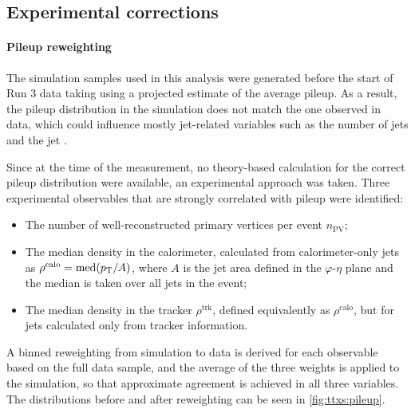 \subsection{Experimental corrections}
\label{sec:ttxs:scalefactors}

\paragraph{Pileup reweighting}

The simulation samples used in this analysis were generated before the start of Run 3 data taking using a projected estimate of the average pileup. As a result, the pileup distribution in the simulation does not match the one observed in data, which could influence mostly jet-related variables such as the number of jets and the jet \pt.

Since at the time of the measurement, no theory-based calculation for the correct pileup distribution were available, an experimental approach was taken. Three experimental observables that are strongly correlated with pileup were identified: 

\begin{itemize}
    \item The number of well-reconstructed primary vertices per event $n_{\mathrm{PV}}$;
    \item The median \pt density in the calorimeter, calculated from calorimeter-only jets as $\rho^{\mathrm{calo}} = \mathrm{med} (p_{\mathrm{T}} / A)$, where $A$ is the jet area defined in the $\varphi$-$\eta$ plane and the median is taken over all jets in the event;
    \item The median \pt density in the tracker $\rho^{\mathrm{trk}}$, defined equivalently as $\rho^{\mathrm{calo}}$, but for jets calculated only from tracker information.
\end{itemize}

A binned reweighting from simulation to data is derived for each observable based on the full data sample, and the average of the three weights is applied to the simulation, so that approximate agreement is achieved in all three variables. The distributions before and after reweighting can be seen in \cref{fig:ttxs:pileup}.


